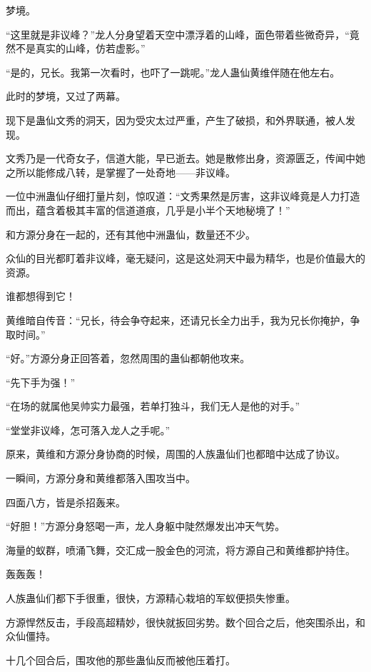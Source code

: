 
\begin{this_body}



梦境。

“这里就是非议峰？”龙人分身望着天空中漂浮着的山峰，面色带着些微奇异，“竟然不是真实的山峰，仿若虚影。”

“是的，兄长。我第一次看时，也吓了一跳呢。”龙人蛊仙黄维伴随在他左右。

此时的梦境，又过了两幕。

现下是蛊仙文秀的洞天，因为受灾太过严重，产生了破损，和外界联通，被人发现。

文秀乃是一代奇女子，信道大能，早已逝去。她是散修出身，资源匮乏，传闻中她之所以能修成八转，是掌握了一处奇地——非议峰。

一位中洲蛊仙仔细打量片刻，惊叹道：“文秀果然是厉害，这非议峰竟是人力打造而出，蕴含着极其丰富的信道道痕，几乎是小半个天地秘境了！”

和方源分身在一起的，还有其他中洲蛊仙，数量还不少。

众仙的目光都盯着非议峰，毫无疑问，这是这处洞天中最为精华，也是价值最大的资源。

谁都想得到它！

黄维暗自传音：“兄长，待会争夺起来，还请兄长全力出手，我为兄长你掩护，争取时间。”

“好。”方源分身正回答着，忽然周围的蛊仙都朝他攻来。

“先下手为强！”

“在场的就属他吴帅实力最强，若单打独斗，我们无人是他的对手。”

“堂堂非议峰，怎可落入龙人之手呢。”

原来，黄维和方源分身协商的时候，周围的人族蛊仙们也都暗中达成了协议。

一瞬间，方源分身和黄维都落入围攻当中。

四面八方，皆是杀招轰来。

“好胆！”方源分身怒喝一声，龙人身躯中陡然爆发出冲天气势。

海量的蚁群，喷涌飞舞，交汇成一股金色的河流，将方源自己和黄维都护持住。

轰轰轰！

人族蛊仙们都下手很重，很快，方源精心栽培的军蚁便损失惨重。

方源悍然反击，手段高超精妙，很快就扳回劣势。数个回合之后，他突围杀出，和众仙僵持。

十几个回合后，围攻他的那些蛊仙反而被他压着打。


\end{this_body}
